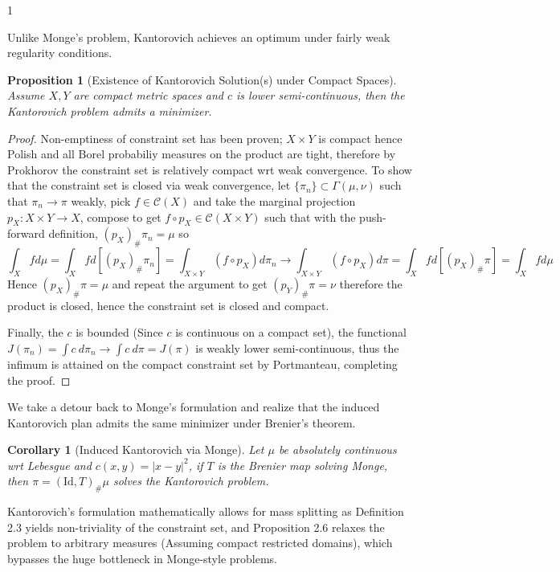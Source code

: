 \documentclass[12pt]{article}
\newtheorem{proposition}[theorem]{Proposition}
\newtheorem{corollary}[theorem]{Corollary}
\theoremstyle{definition}
\theoremstyle{plain}
\begin{document}
\begin{spacing}{1}
{Unlike Monge's problem, Kantorovich achieves an optimum under fairly weak regularity conditions.

\begin{proposition}[Existence of Kantorovich Solution(s) under Compact Spaces]
    Assume $X, Y$ are compact metric spaces and $c$ is lower semi-continuous, then the Kantorovich problem admits a minimizer.
\end{proposition}

\begin{proof}
    Non-emptiness of constraint set has been proven; $X \times Y$ is compact hence Polish and all Borel probabiliy measures on the product are tight, therefore by Prokhorov the constraint set is relatively compact wrt weak convergence. To show that the constraint set is closed via weak convergence, let $\{\pi_n\} \subset \Gamma(\mu, \nu)$ such that $\pi_n \rightarrow \pi$ weakly, pick $f \in \mathcal{C}(X)$ and take the marginal projection $p_X: X \times Y \rightarrow X$, compose to get $f \circ p_X \in \mathcal{C}(X \times Y)$ such that with the push-forward definition, $(p_X)_\#\pi_n = \mu$ so
    \[
    \displaystyle \int_X f d\mu = \int_X f d[(p_X)_\#\pi_n] = \int_{X \times Y} (f\circ p_X) d\pi_n \rightarrow \int_{X \times Y} (f \circ p_X) d\pi = \int_X f d[(p_X)_\#\pi] = \int_X f d\mu
    \]
    Hence $(p_X)_\#\pi = \mu$ and repeat the argument to get $(p_Y)_\#\pi = \nu$ therefore the product is closed, hence the constraint set is closed and compact.

    Finally, the $c$ is bounded (Since $c$ is continuous on a compact set), the functional $J(\pi_n) =  \displaystyle \int c \ d\pi_n \rightarrow \int c \ d\pi = J(\pi)$ is weakly lower semi-continuous, thus the infimum is attained on the compact constraint set by Portmanteau, completing the proof.
\end{proof}

We take a detour back to Monge's formulation and realize that the induced Kantorovich plan admits the same minimizer under Brenier's theorem.

\begin{corollary}[Induced Kantorovich via Monge]
    Let $\mu$ be absolutely continuous wrt Lebesgue and $c(x, y) = \lvert x - y \rvert^2$, if $T$ is the Brenier map solving Monge, then $\pi = (\text{Id}, T)_\#\mu$ solves the Kantorovich problem.
\end{corollary}

Kantorovich's formulation mathematically allows for mass splitting as Definition 2.3 yields non-triviality of the constraint set, and Proposition 2.6 relaxes the problem to arbitrary measures (Assuming compact restricted domains), which bypasses the huge bottleneck in Monge-style problems. 

}
\end{spacing}
\end{document}

